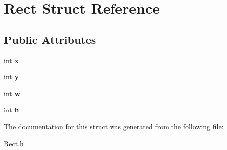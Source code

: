 \hypertarget{struct_rect}{}\section{Rect Struct Reference}
\label{struct_rect}
\subsection*{Public Attributes}
\begin{DoxyCompactItemize}
\item 
\mbox{\label{struct_rect_a64d1ef14e429e1816539de4c54361e55}} 
int {\bfseries x}
\item 
\mbox{\label{struct_rect_a1e37b6f8a4fb0d68ba22c8fffffab0a4}} 
int {\bfseries y}
\item 
\mbox{\label{struct_rect_a36b6c8bb15c7706c3b2b3e91345e11f8}} 
int {\bfseries w}
\item 
\mbox{\label{struct_rect_af9111a21106ba65952da60320ea91df6}} 
int {\bfseries h}
\end{DoxyCompactItemize}


The documentation for this struct was generated from the following file\+:\begin{DoxyCompactItemize}
\item 
Rect.\+h\end{DoxyCompactItemize}
